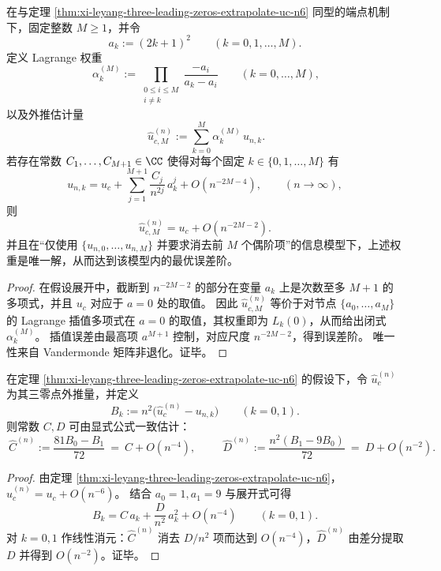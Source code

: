 \begin{theorem}\label{thm:xi-leyang-mplus1-point-extrapolate-uc-optimal}
在与定理 \ref{thm:xi-leyang-three-leading-zeros-extrapolate-uc-n6} 同型的端点机制下，固定整数 \(M\ge 1\)，并令
\[
a_k:=(2k+1)^2\qquad (k=0,1,\dots,M).
\]
定义 Lagrange 权重
\[
\boxed{\
\alpha_{k}^{(M)}
:=
\prod_{\substack{0\le i\le M\\ i\ne k}}
\frac{-a_{i}}{a_{k}-a_{i}}
\qquad(k=0,\dots,M),
}
\]
以及外推估计量
\[
\boxed{\
\widehat u_{c,M}^{(n)}:=\sum_{k=0}^{M}\alpha_{k}^{(M)}\,u_{n,k}.
}
\]
若存在常数 \(C_1,\dots,C_{M+1}\in\CC\) 使得对每个固定 \(k\in\{0,1,\dots,M\}\) 有
\[
u_{n,k}
=
u_c+\sum_{j=1}^{M+1}\frac{C_j}{n^{2j}}\,a_k^{j}+O(n^{-2M-4}),
\qquad(n\to\infty),
\]
则
\[
\boxed{\ \widehat u_{c,M}^{(n)}=u_c+O(n^{-2M-2}).\ }
\]
并且在“仅使用 \(\{u_{n,0},\dots,u_{n,M}\}\) 并要求消去前 \(M\) 个偶阶项”的信息模型下，上述权重是唯一解，从而达到该模型内的最优误差阶。
\end{theorem}
\begin{proof}
在假设展开中，截断到 \(n^{-2M-2}\) 的部分在变量 \(a_k\) 上是次数至多 \(M+1\) 的多项式，并且 \(u_c\) 对应于 \(a=0\) 处的取值。
因此 \(\widehat u_{c,M}^{(n)}\) 等价于对节点 \(\{a_0,\dots,a_M\}\) 的 Lagrange 插值多项式在 \(a=0\) 的取值，其权重即为 \(L_k(0)\)，从而给出闭式 \(\alpha_k^{(M)}\)。
插值误差由最高项 \(a^{M+1}\) 控制，对应尺度 \(n^{-2M-2}\)，得到误差阶。
唯一性来自 Vandermonde 矩阵非退化。证毕。
\end{proof}

\begin{corollary}[由三零点同时恢复主标度常数与次阶常数]\label{cor:xi-leyang-recover-C-D-from-three-leading-zeros}
在定理 \ref{thm:xi-leyang-three-leading-zeros-extrapolate-uc-n6} 的假设下，令 \(\widehat u_c^{(n)}\) 为其三零点外推量，并定义
\[
B_k:=n^{2}\bigl(\widehat u_{c}^{(n)}-u_{n,k}\bigr)\qquad(k=0,1).
\]
则常数 \(C,D\) 可由显式公式一致估计：
\[
\boxed{\
\widehat C^{(n)}:=\frac{81B_{0}-B_{1}}{72}
\ =\ C+O(n^{-4}),\ }
\qquad
\boxed{\
\widehat D^{(n)}:=\frac{n^{2}(B_{1}-9B_{0})}{72}
\ =\ D+O(n^{-2}).\ }
\]
\end{corollary}
\begin{proof}
由定理 \ref{thm:xi-leyang-three-leading-zeros-extrapolate-uc-n6}，
\(
\widehat u_c^{(n)}=u_c+O(n^{-6})
\)。
结合 \(a_0=1,a_1=9\) 与展开式可得
\[
B_k=C\,a_k+\frac{D}{n^2}\,a_k^2+O(n^{-4})\qquad(k=0,1).
\]
对 \(k=0,1\) 作线性消元：\(\widehat C^{(n)}\) 消去 \(D/n^2\) 项而达到 \(O(n^{-4})\)，\(\widehat D^{(n)}\) 由差分提取 \(D\) 并得到 \(O(n^{-2})\)。证毕。
\end{proof}

